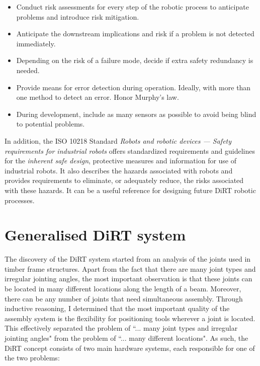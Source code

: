 \begin{itemize}
	\item Conduct risk assessments for every step of the robotic process to anticipate problems and introduce risk mitigation.

	\item Anticipate the downstream implications and risk if a problem is not detected immediately. 

	\item Depending on the risk of a failure mode, decide if extra safety redundancy is needed.

	\item Provide means for error detection during operation. Ideally, with more than one method to detect an error. Honor Murphy's law.

	\item During development, include as many sensors as possible to avoid being blind to potential problems.

\end{itemize}

In addition, the ISO 10218 Standard \textit{Robots and robotic devices — Safety requirements for industrial robots} \cite{iso10218:2011RobotsRoboticDevices2011} offers standardized requirements and guidelines for the \textit{inherent safe design}, protective measures and information for use of industrial robots. It also describes the hazards associated with robots and provides requirements to eliminate, or adequately reduce, the risks associated with these hazards. It can be a useful reference for designing future DiRT robotic processes.

\section{Generalised DiRT system}
\label{section:discussion-generalised-dirt-system}

The discovery of the DiRT system started from an analysis of the joints used in timber frame structures. Apart from the fact that there are many joint types and irregular jointing angles, the most important observation is that these joints can be located in many different locations along the length of a beam. Moreover, there can be any number of joints that need simultaneous assembly. Through inductive reasoning, I determined that the most important quality of the assembly system is the flexibility for positioning tools wherever a joint is located. This effectively separated the problem of ``... many joint types and irregular jointing angles" from the problem of ``... many different locations". As such, the DiRT concept consists of two main hardware systems, each responsible for one of the two problems:

